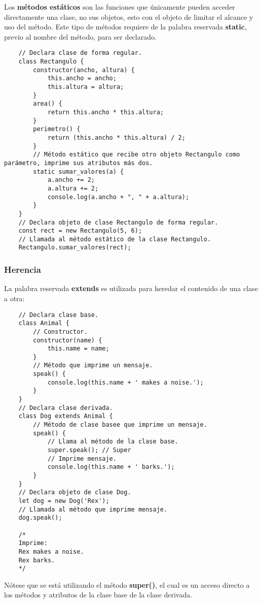 Los \textbf{métodos estáticos} son las funciones que únicamente pueden acceder directamente una clase, no sus objetos, esto con el objeto de limitar el alcance y uso del método. Este tipo de métodos requiere de la palabra reservada \textbf{static}, previo al nombre del método, para ser declarado.
\begin{lstlisting}
    // Declara clase de forma regular.
    class Rectangulo {
        constructor(ancho, altura) {
            this.ancho = ancho;
            this.altura = altura;
        }
        area() {
            return this.ancho * this.altura;
        }
        perimetro() {
            return (this.ancho * this.altura) / 2;
        }
        // Método estático que recibe otro objeto Rectangulo como parámetro, imprime sus atributos más dos.
        static sumar_valores(a) {
            a.ancho += 2;
            a.altura += 2;
            console.log(a.ancho + ", " + a.altura);
        }
    }
    // Declara objeto de clase Rectangulo de forma regular.
    const rect = new Rectangulo(5, 6);
    // Llamada al método estático de la clase Rectangulo.
    Rectangulo.sumar_valores(rect);
\end{lstlisting}


\subsubsection{Herencia}
\hspace{0.55cm}La palabra reservada \textbf{extends} es utilizada para heredar el contenido de una clase a otra:
\begin{lstlisting}
    // Declara clase base.
    class Animal {
        // Constructor.
        constructor(name) {
            this.name = name;
        }
        // Método que imprime un mensaje.
        speak() {
            console.log(this.name + ' makes a noise.');
        }
    }
    // Declara clase derivada.
    class Dog extends Animal {
        // Método de clase basee que imprime un mensaje.
        speak() {
            // Llama al método de la clase base.
            super.speak(); // Super
            // Imprime mensaje.
            console.log(this.name + ' barks.');
        }
    }
    // Declara objeto de clase Dog.
    let dog = new Dog('Rex');
    // Llamada al método que imprime mensaje.
    dog.speak();

    /*
    Imprime:
    Rex makes a noise.
    Rex barks.
    */
\end{lstlisting}

Nótese que se está utilizando el método \textbf{super()}, el cual es un acceso directo a los métodos y atributos de la clase base de la clase derivada.


